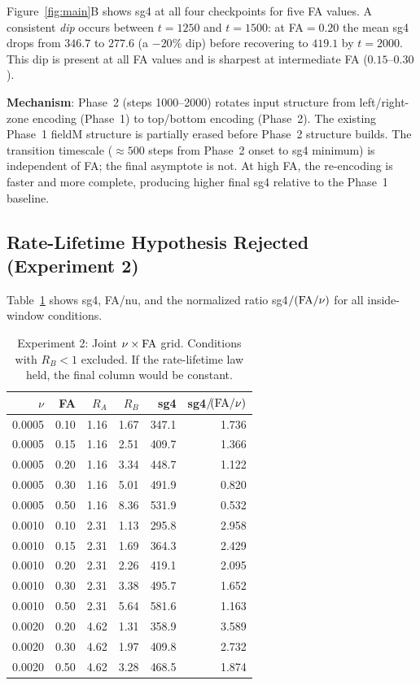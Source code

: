 \documentclass[11pt]{article}
\begin{document}
Figure~\ref{fig:main}B shows sg4 at all four checkpoints for five FA values.
A consistent \emph{dip} occurs between $t=1250$ and $t=1500$:
at FA$=0.20$ the mean sg4 drops from $346.7$ to $277.6$ (a $-20\%$ dip)
before recovering to $419.1$ by $t=2000$.
This dip is present at all FA values and is sharpest at intermediate FA
($0.15$--$0.30$).

\textbf{Mechanism}: Phase~2 (steps 1000--2000) rotates input structure from
left/right-zone encoding (Phase~1) to top/bottom encoding (Phase~2).
The existing Phase~1 fieldM structure is partially erased before Phase~2
structure builds.
The transition timescale ($\approx 500$ steps from Phase~2 onset to sg4 minimum)
is independent of FA; the final asymptote is not.
At high FA, the re-encoding is faster and more complete, producing higher
final sg4 relative to the Phase~1 baseline.

\subsection{Rate-Lifetime Hypothesis Rejected (Experiment 2)}

Table~\ref{tab:exp2} shows sg4, FA/nu, and the normalized ratio
sg4$/({\rm FA}/\nu)$ for all inside-window conditions.

\begin{table}[ht]
\centering
\caption{Experiment 2: Joint $\nu \times {\rm FA}$ grid. Conditions with
$R_B < 1$ excluded. If the rate-lifetime law held, the final column
would be constant.}
\label{tab:exp2}
\begin{tabular}{rrrrrr}
\toprule
$\nu$ & FA & $R_A$ & $R_B$ & sg4 & sg4$/\!({\rm FA}/\nu)$ \\
\midrule
0.0005 & 0.10 & 1.16 & 1.67 & 347.1 & 1.736 \\
0.0005 & 0.15 & 1.16 & 2.51 & 409.7 & 1.366 \\
0.0005 & 0.20 & 1.16 & 3.34 & 448.7 & 1.122 \\
0.0005 & 0.30 & 1.16 & 5.01 & 491.9 & 0.820 \\
0.0005 & 0.50 & 1.16 & 8.36 & 531.9 & 0.532 \\
\midrule
0.0010 & 0.10 & 2.31 & 1.13 & 295.8 & 2.958 \\
0.0010 & 0.15 & 2.31 & 1.69 & 364.3 & 2.429 \\
0.0010 & 0.20 & 2.31 & 2.26 & 419.1 & 2.095 \\
0.0010 & 0.30 & 2.31 & 3.38 & 495.7 & 1.652 \\
0.0010 & 0.50 & 2.31 & 5.64 & 581.6 & 1.163 \\
\midrule
0.0020 & 0.20 & 4.62 & 1.31 & 358.9 & 3.589 \\
0.0020 & 0.30 & 4.62 & 1.97 & 409.8 & 2.732 \\
0.0020 & 0.50 & 4.62 & 3.28 & 468.5 & 1.874 \\
\bottomrule
\end{tabular}
\end{table}
\end{document}
